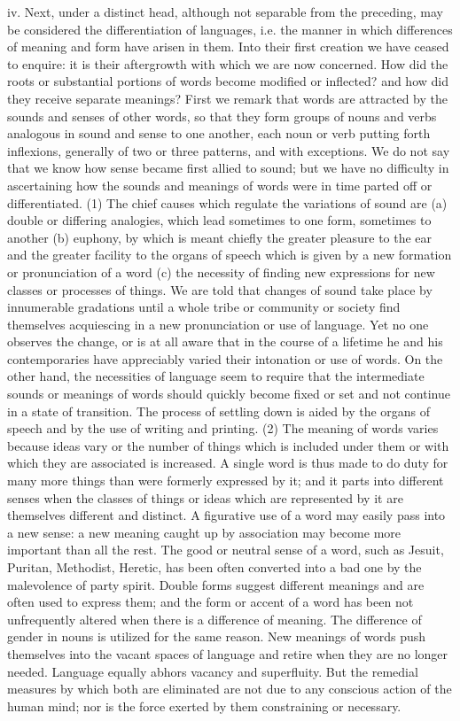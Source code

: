 \documentclass[11pt,letter]{article}
\begin{document}
\par  iv. Next, under a distinct head, although not separable from the preceding, may be considered the differentiation of languages, i.e. the manner in which differences of meaning and form have arisen in them. Into their first creation we have ceased to enquire: it is their aftergrowth with which we are now concerned. How did the roots or substantial portions of words become modified or inflected? and how did they receive separate meanings? First we remark that words are attracted by the sounds and senses of other words, so that they form groups of nouns and verbs analogous in sound and sense to one another, each noun or verb putting forth inflexions, generally of two or three patterns, and with exceptions. We do not say that we know how sense became first allied to sound; but we have no difficulty in ascertaining how the sounds and meanings of words were in time parted off or differentiated. (1) The chief causes which regulate the variations of sound are (a) double or differing analogies, which lead sometimes to one form, sometimes to another (b) euphony, by which is meant chiefly the greater pleasure to the ear and the greater facility to the organs of speech which is given by a new formation or pronunciation of a word (c) the necessity of finding new expressions for new classes or processes of things. We are told that changes of sound take place by innumerable gradations until a whole tribe or community or society find themselves acquiescing in a new pronunciation or use of language. Yet no one observes the change, or is at all aware that in the course of a lifetime he and his contemporaries have appreciably varied their intonation or use of words. On the other hand, the necessities of language seem to require that the intermediate sounds or meanings of words should quickly become fixed or set and not continue in a state of transition. The process of settling down is aided by the organs of speech and by the use of writing and printing. (2) The meaning of words varies because ideas vary or the number of things which is included under them or with which they are associated is increased. A single word is thus made to do duty for many more things than were formerly expressed by it; and it parts into different senses when the classes of things or ideas which are represented by it are themselves different and distinct. A figurative use of a word may easily pass into a new sense: a new meaning caught up by association may become more important than all the rest. The good or neutral sense of a word, such as Jesuit, Puritan, Methodist, Heretic, has been often converted into a bad one by the malevolence of party spirit. Double forms suggest different meanings and are often used to express them; and the form or accent of a word has been not unfrequently altered when there is a difference of meaning. The difference of gender in nouns is utilized for the same reason. New meanings of words push themselves into the vacant spaces of language and retire when they are no longer needed. Language equally abhors vacancy and superfluity. But the remedial measures by which both are eliminated are not due to any conscious action of the human mind; nor is the force exerted by them constraining or necessary.
\end{document}
